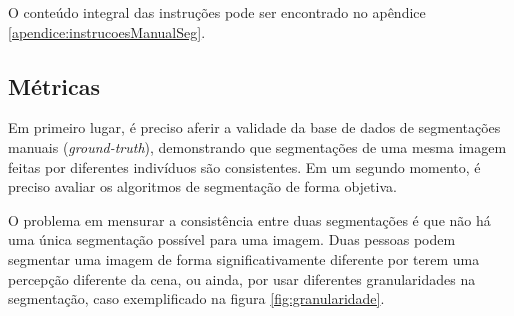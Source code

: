 O conteúdo integral das instruções pode ser encontrado no apêndice \ref{apendice:instrucoesManualSeg}.

\subsection{Métricas}


Em primeiro lugar, é preciso aferir a validade da base de dados de segmentações manuais (\textit{ground-truth}), demonstrando que segmentações de uma mesma imagem feitas por diferentes indivíduos são consistentes. Em um segundo momento, é preciso avaliar os algoritmos de segmentação de forma objetiva.

O problema em mensurar a consistência entre duas segmentações é que não há uma única segmentação possível para uma imagem. Duas pessoas podem segmentar uma imagem de forma significativamente diferente por terem uma percepção diferente da cena, ou ainda, por usar diferentes granularidades na segmentação, caso exemplificado na figura \ref{fig:granularidade}.

